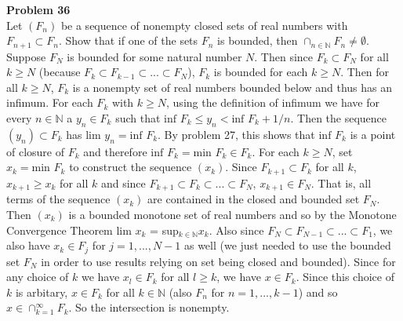 \documentclass[a4paper]{article}
\begin{document}
{\bf Problem 36}\\
Let $(F_n)$ be a sequence of nonempty closed sets of real numbers with $F_{n+1} \subset F_n$. Show that if one of the sets $F_n$ is bounded, then $\cap_{n \in \mathbb{N}} F_n \neq \emptyset$. \\

Suppose $F_N$ is bounded for some natural number $N$. Then since $F_k \subset F_N$ for all $k\geq N$ (because $F_k \subset F_{k-1} \subset ... \subset F_N$), $F_k$ is bounded for each $k \geq N$. Then for all $k\geq N$, $F_k$ is a nonempty set of real numbers bounded below and thus has an infimum. For each $F_k$ with $k \geq N$, using the definition of infimum we have for every $n \in \mathbb{N}$ a $y_n \in F_k$ such that $\text{inf } F_k \leq y_n < \text{inf } F_k + 1/n$. Then the sequence $(y_n) \subset F_k$ has lim $y_n = \text{inf } F_k$. By problem 27, this shows that $\text{inf } F_k$ is a point of closure of $F_k$ and therefore $\text{inf } F_k = \text{min } F_k \in F_k$. For each $k\geq N$, set $x_k = \text{min } F_k$ to construct the sequence $(x_k)$. Since $F_{k+1} \subset F_{k}$ for all $k$, $x_{k+1} \geq x_k$ for all $k$ and since $F_{k+1} \subset F_{k} \subset ... \subset F_N$, $x_{k+1} \in F_N$. That is, all terms of  the sequence $(x_k)$ are contained in the closed and bounded set $F_N$. Then $(x_k)$ is a bounded monotone set of real numbers and so by the Monotone Convergence Theorem lim $x_k$ = sup$_{k \in \mathbb{N}} x_k$. Also since $F_N \subset F_{N-1} \subset ... \subset F_1$, we also have $x_k \in F_j$ for $j = 1,...,N-1$ as well (we just needed to use the bounded set $F_N$ in order to use results relying on set being closed and bounded). Since for any choice of $k$ we have $x_l \in F_k$ for all $l \geq k$, we have $x\in F_k$. Since this choice of $k$ is arbitary, $x \in F_k$ for all $k\in \mathbb{N}$ (also $F_n$ for $n = 1,...,k-1$) and so $x \in \cap_{k=1}^\infty F_k$. So the intersection is nonempty.
\end{document}
